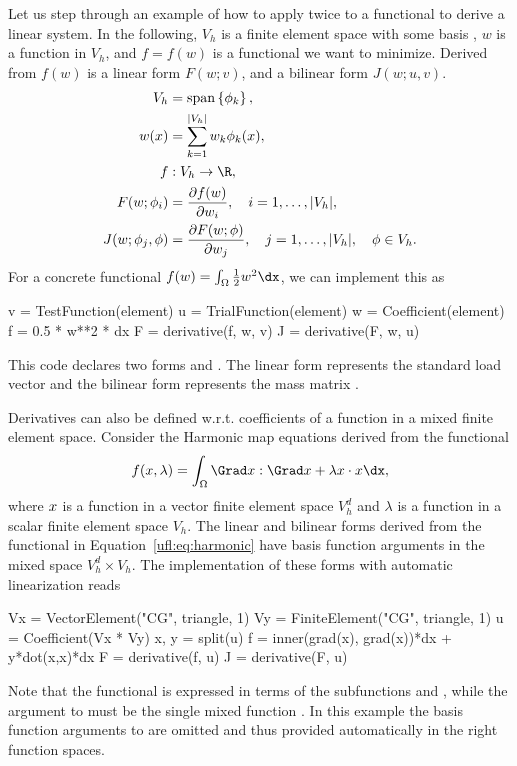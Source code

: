 Let us step through an example of how to apply  twice
to a functional to derive a linear system.  In the following, $V_h$
is a finite element space with some basis , $w$ is a function in $V_h$,
and $f = f(w)$ is a functional we want to minimize. Derived from $f(w)$
is a linear form $F(w; v)$, and a bilinear form $J(w; u, v)$.
\begin{align}
V_h &= \spans{ \phi_k }, \\
w(x) &= \sum_{k=1}^{|V_h|} w_k \phi_k(x), \\
f&: V_h \rightarrow \R, \\
F(w; \phi_i) &= \frac{\partial f(w)}{\partial w_i},
  \quad i=1,\ldots,|V_h|, \\
J(w; \phi_j, \phi) &= \frac{\partial F(w; \phi)}{\partial w_j},
  \quad j=1,\ldots,|V_h|, \quad \phi\in V_h.
\end{align}
For a concrete functional $f(w) = \int_\Omega \frac 1 2 w^2 \dx$, we
can implement this as
\begin{uflcode}
v = TestFunction(element)
u = TrialFunction(element)
w = Coefficient(element)
f = 0.5 * w**2 * dx
F = derivative(f, w, v)
J = derivative(F, w, u)
\end{uflcode}
This code declares two forms  and .  The linear form 
represents the standard load vector  and the bilinear form
 represents the mass matrix .

Derivatives can also be defined w.r.t. coefficients of a function in a
mixed finite element space.  Consider the Harmonic map equations derived
from the functional
\begin{align} \label{ufl:eq:harmonic}
f(\xx, \lambda) = \int_\Omega \Grad \xx : \Grad \xx + \lambda \xx\cdot\xx \dx,
\end{align}
where ${x}$ is a function in a vector finite element space $V_h^d$
and $\lambda$ is a function in a scalar finite element space
$V_h$.  The linear and bilinear forms derived from the functional in
Equation~\ref{ufl:eq:harmonic} have basis function arguments in the mixed
space $V_h^d \times V_h$. The implementation of these forms with automatic
linearization reads
\begin{uflcode}
Vx = VectorElement("CG", triangle, 1)
Vy = FiniteElement("CG", triangle, 1)
u = Coefficient(Vx * Vy)
x, y = split(u)
f = inner(grad(x), grad(x))*dx + y*dot(x,x)*dx
F = derivative(f, u)
J = derivative(F, u)
\end{uflcode}
Note that the functional is expressed in terms of the subfunctions 
and , while the argument to  must be the single
mixed function .  In this example the basis function arguments
to  are omitted and thus provided automatically in the
right function spaces.

